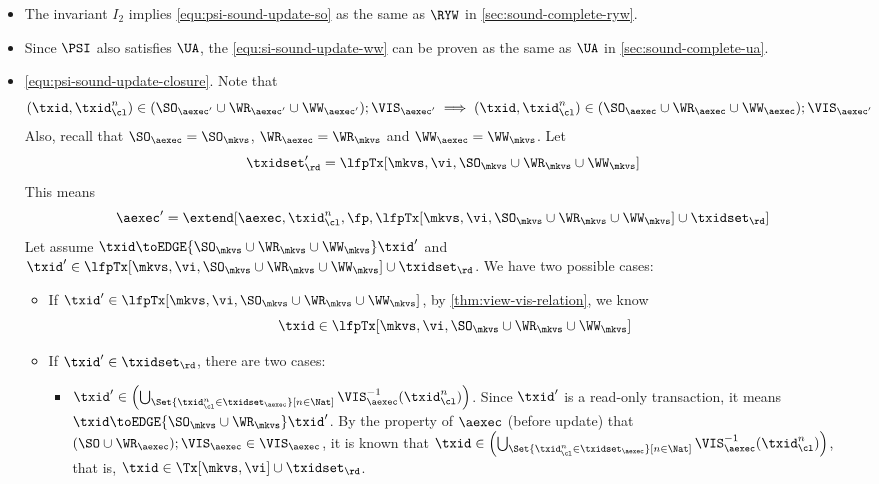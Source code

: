 \begin{itemize}
\item The invariant \( I_2 \) implies \cref{equ:psi-sound-update-so} as the same as \( \RYW \) in \cref{sec:sound-complete-ryw}.
\item Since \( \PSI \) also satisfies \( \UA \), the \cref{equ:si-sound-update-ww} can be proven as the same as \( \UA \) in \cref{sec:sound-complete-ua}.
\item \cref{equ:psi-sound-update-closure}.
    Note that \[ (\txid, \txid_\cl^n) \in ( \SO_{\aexec'} \cup \WR_{\aexec'} \cup \WW_{\aexec'}); \VIS_{\aexec'} \implies (\txid, \txid_\cl^n) \in ( \SO_{\aexec} \cup \WR_{\aexec}  \cup \WW_{\aexec} ) ; \VIS_{\aexec'} \]
    Also, recall that \( \SO_\aexec = \SO_\mkvs \), \( \WR_\aexec = \WR_\mkvs \) and  \( \WW_\aexec = \WW_\mkvs \).
    Let \[ \txidset'_\rd = \lfpTx[\mkvs,\vi,\SO_{\mkvs} \cup \WR_{\mkvs} \cup \WW_{\mkvs}] \]
    This means \[ \aexec' = \extend[\aexec, \txid_\cl^n, \fp, \lfpTx[\mkvs, \vi, \SO_{\mkvs} \cup \WR_{\mkvs} \cup \WW_\mkvs] \cup \txidset_\rd ] \]
    Let assume \( \txid \toEDGE{\SO_{\mkvs} \cup \WR_{\mkvs} \cup \WW_{\mkvs}} \txid' \) and \( \txid' \in \lfpTx[\mkvs, \vi, \SO_{\mkvs} \cup \WR_{\mkvs}\cup \WW_\mkvs ] \cup \txidset_\rd \).
    We have two possible cases:
    \begin{itemize}
        \item If \( \txid' \in \lfpTx[\mkvs, \vi, \SO_{\mkvs} \cup \WR_{\mkvs} \cup \WW_{\mkvs}] \), by  \cref{thm:view-vis-relation}, we know \[ \txid \in \lfpTx[\mkvs, \vi, \SO_{\mkvs} \cup \WR_{\mkvs} \cup \WW_{\mkvs}] \]
        \item If \( \txid' \in \txidset_\rd \), there are two cases:
        \begin{itemize}
            \item \( \txid' \in  \left( \bigcup_{\Set{\txid_{\cl}^{n} \in \txidset_{\aexec} }[ n \in \Nat ]} \VIS_{\aexec}^{-1}(\txid^n_\cl) \right) \).
                Since \( \txid' \) is a read-only transaction, it means \( \txid \toEDGE{\SO_{\mkvs} \cup \WR_{\mkvs} } \txid' \).
                By the property of \( \aexec \) (before update) that \( ( \SO \cup \WR_\aexec  ) ; \VIS_\aexec \in \VIS_\aexec \), it is known that \( \txid \in \left( \bigcup_{\Set{\txid_{\cl}^{n} \in \txidset_{\aexec} }[ n \in \Nat ]} \VIS_{\aexec}^{-1}(\txid^n_\cl) \right) \), that is, \( \txid \in \Tx[\mkvs,\vi] \cup \txidset_\rd\).


\end{itemize}
\end{itemize}
\end{itemize}
